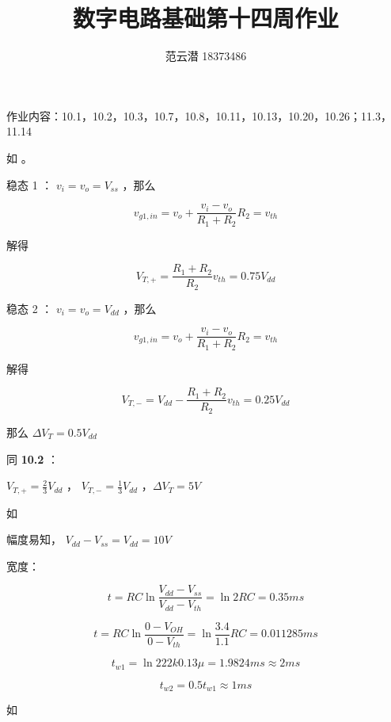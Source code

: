 \documentclass[lang=cn,11pt,a4paper,cite=authoryear,twocolumn]{elegantpaper}
\title{数字电路基础\quad 第十四周作业}
\author{范云潜 18373486}
\institute{微电子学院 184111 班}
\date{\zhtoday}
\begin{document}
\maketitle

作业内容：10.1，10.2，10.3，10.7，10.8，10.11，10.13，10.20，10.26；11.3，11.14


如  。



稳态 1 ： \(v_i = v_o = V_{ss}\) ，那么 

\[v_{g1, in} = v_o + \frac{v_i - v_o}{R_1 + R_2} R_2 = v_{th}\]

解得

\[V_{T,+} = \frac{R_1 + R_2}{R_2} v_{th} = 0.75 V_{dd}\]


稳态 2 ： \(v_i = v_o = V_{dd}\) ，那么 

\[v_{g1, in} = v_o + \frac{v_i - v_o}{R_1 + R_2} R_2 = v_{th}\]

解得

\[V_{T,-} = V_{dd} - \frac{R_1 + R_2}{R_2} v_{th} = 0.25 V_{dd}\]

那么 \(\Delta V_T = 0.5 V_{dd}\) 



同 \textbf{10.2} ：

\(V_{T,+} = \frac{2}{3} V_{dd}\) ， \(V_{T,-} = \frac{1}{3} V_{dd}\) ，\(\Delta V_{T} = 5 V\)


如  



幅度易知， \(V_{dd} - V_{ss} = V_{dd} = 10 V\) 

宽度：

\[t = RC \ln \frac{V_{dd}-V_{ss}}{V_{dd} - V_{th}} = \ln 2 RC = 0.35 ms\]


\[t = RC \ln \frac{0-V_{OH}}{0 - V_{th}} = \ln \frac{3.4}{1.1} RC = 0.011285 ms\]


\[t_{w1} = \ln 2 22k 0.13 \mu = 1.9824 ms \approx 2 ms\]

\[t_{w2} = 0.5 t_{w1} \approx 1 ms\]

如 

\end{document}

